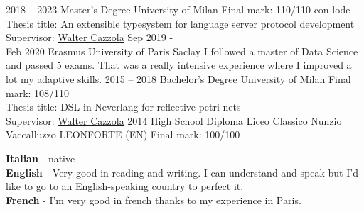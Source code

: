 \documentclass[9pt]{developercv} %
\begin{document}
\begin{entrylist}
	\entry
		{2018 -- 2023}
		{Master's Degree}
		{University of Milan}
		{
			Final mark: 110/110 con lode\\
			Thesis title: An extensible typesystem for language server protocol development\\
			Supervisor: \href{https://cazzola.di.unimi.it}{Walter Cazzola}
		}
	\entry
	{Sep 2019 - \\Feb 2020}
	{Erasmus}
	{University of Paris Saclay}
	{
		I followed a master of Data Science and passed 5 exams.
		That was a really intensive experience where I improved a lot my adaptive skills.
	}
	\entry
	{2015 -- 2018}
	{Bachelor's Degree}
	{University of Milan}
	{
		Final mark: 108/110\\
		Thesis title: DSL in Neverlang for reflective petri nets\\
		Supervisor: \href{https://cazzola.di.unimi.it}{Walter Cazzola}
	}
	\entry
	{2014}
	{High School Diploma}
	{Liceo Classico Nunzio Vaccalluzzo LEONFORTE (EN)}
	{
		Final mark: 100/100\\
	}
\end{entrylist}


\begin{minipage}[t]{0.5\textwidth}
	\vspace{-\baselineskip} %


	\textbf{Italian} - native\\
	\textbf{English} - Very good in reading and writing. I can understand and speak but I'd like to go to an English-speaking country to perfect it.\\
	\textbf{French} - I'm very good in french thanks to my experience in Paris.
\end{minipage}
\hfill
\begin{minipage}[t]{0.3\textwidth}
	\vspace{-\baselineskip} %


\end{minipage}


\end{document}
